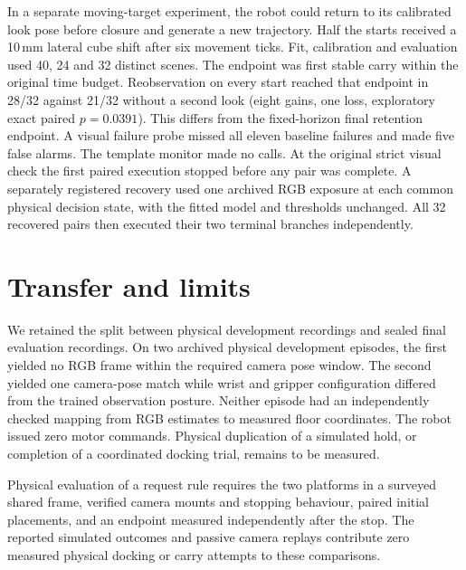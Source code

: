 \documentclass[conference]{IEEEtran}
\begin{document}
In a separate moving-target experiment, the robot could return to its calibrated look pose before closure and generate a new trajectory. Half the starts received a 10\,mm lateral cube shift after six movement ticks. Fit, calibration and evaluation used 40, 24 and 32 distinct scenes. The endpoint was first stable carry within the original time budget. Reobservation on every start reached that endpoint in 28/32 against 21/32 without a second look (eight gains, one loss, exploratory exact paired $p=0.0391$). This differs from the fixed-horizon final retention endpoint. A visual failure probe missed all eleven baseline failures and made five false alarms. The template monitor made no calls. At the original strict visual check the first paired execution stopped before any pair was complete. A separately registered recovery used one archived RGB exposure at each common physical decision state, with the fitted model and thresholds unchanged. All 32 recovered pairs then executed their two terminal branches independently.

\section{Transfer and limits}
We retained the split between physical development recordings and sealed final evaluation recordings. On two archived physical development episodes, the first yielded no RGB frame within the required camera pose window. The second yielded one camera-pose match while wrist and gripper configuration differed from the trained observation posture. Neither episode had an independently checked mapping from RGB estimates to measured floor coordinates. The robot issued zero motor commands. Physical duplication of a simulated hold, or completion of a coordinated docking trial, remains to be measured.

Physical evaluation of a request rule requires the two platforms in a surveyed shared frame, verified camera mounts and stopping behaviour, paired initial placements, and an endpoint measured independently after the stop. The reported simulated outcomes and passive camera replays contribute zero measured physical docking or carry attempts to these comparisons.
\end{document}
